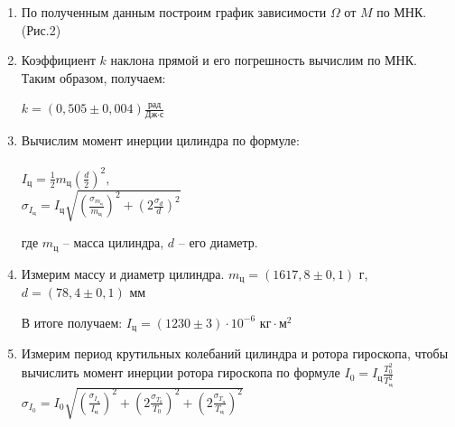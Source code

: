 \documentclass[a4paper, 12pt]{article}%
\begin{document}
\begin{enumerate}
	\item По полученным данным построим график зависимости $\Omega$ от $M$ по МНК.(Рис.2)
	\item Коэффициент $ k $ наклона прямой и его погрешность вычислим  по МНК.
	Таким образом, получаем:
	
	$k =\left( 0,505 \pm 0,004 \right) \frac{\text{рад}}{\text{Дж} \cdot \text{с}}$\\
	
	
	\begin{figure}[H]
	\caption{}
	\end{figure}
	
	\item Вычислим момент инерции цилиндра по формуле:\\
	\\
	$I_\text{ц} = \frac{1}{2}m_\text{ц}\left( \frac{d}{2}\right)^2,$\\
		$	\sigma_{I_\text{ц}} = I_\text{ц}\sqrt{\left( \frac{\sigma_{m_{\text{ц}}}}{m_\text{ц}} \right)^2 + \left(2 \frac{\sigma_d}{d} \right)^2 } $
		
	где $ m_\text{ц} $ -- масса цилиндра, $ d $ -- его диаметр.
	\item Измерим массу и диаметр цилиндра.
		 $ m_\text{ц} = \left( 1617,8 \pm 0,1\right) $ г, 
	$ d = \left( 78,4 \pm 0,1 \right) $ мм

	В итоге получаем: $ I_\text{ц} = \left(1230 \pm 3 \right)\cdot 10^{-6} \text{ кг} \cdot \text{м}^2 $
	\item Измерим период крутильных колебаний цилиндра и ротора гироскопа, чтобы вычислить момент инерции ротора гироскопа по  формуле $I_0=I_\text{ц}\frac{T_0^2}{T_\text{ц}^2}$\\
	$	\sigma_{I_0} = I_0\sqrt{\left( \frac{\sigma_{I_{\text{ц}}}}{I_\text{ц}} \right)^2 + \left(2 \frac{\sigma_{T_0}}{T_0} \right)^2+ \left(2 \frac{\sigma_{T_{\text{ц}}}}{T_{\text{ц}}} \right)^2 } $
	

\end{enumerate}
\end{document}
